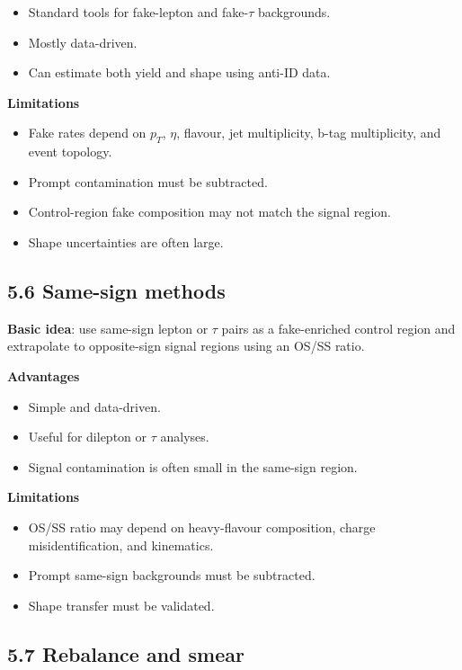 \documentclass[11pt]{article}
\begin{document}
\begin{itemize}
\item Standard tools for fake-lepton and fake-$\tau$ backgrounds.
\item Mostly data-driven.
\item Can estimate both yield and shape using anti-ID data.
\end{itemize}

\textbf{Limitations}

\begin{itemize}
\item Fake rates depend on \(p_T\), \(\eta\), flavour, jet multiplicity, b-tag multiplicity, and event topology.
\item Prompt contamination must be subtracted.
\item Control-region fake composition may not match the signal region.
\item Shape uncertainties are often large.
\end{itemize}

\subsection{5.6 Same-sign methods}

\textbf{Basic idea}: use same-sign lepton or $\tau$ pairs as a fake-enriched control region and extrapolate to opposite-sign signal regions using an OS/SS ratio.

\textbf{Advantages}

\begin{itemize}
\item Simple and data-driven.
\item Useful for dilepton or $\tau$ analyses.
\item Signal contamination is often small in the same-sign region.
\end{itemize}

\textbf{Limitations}

\begin{itemize}
\item OS/SS ratio may depend on heavy-flavour composition, charge misidentification, and kinematics.
\item Prompt same-sign backgrounds must be subtracted.
\item Shape transfer must be validated.
\end{itemize}

\subsection{5.7 Rebalance and smear}
\end{document}
